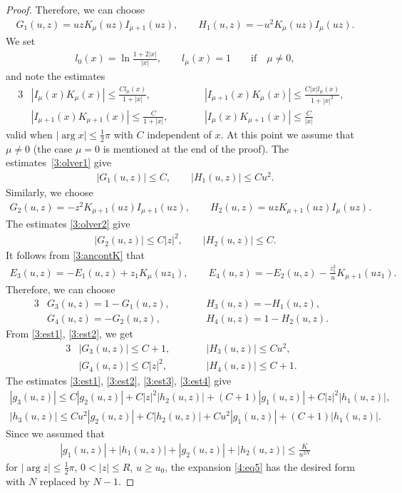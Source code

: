 \documentclass[pdftex]{sigma}
\numberwithin{equation}{section}
\begin{document}
\begin{proof}
Therefore, we can choose
\begin{gather*}
G_1(u,z) = uz K_\mu(uz)I_{\mu+1}(uz),\qquad
H_1(u,z) = -u^2K_\mu(uz)I_\mu(uz) .
\end{gather*}
We set
\begin{gather*}
l_0(x)=\ln\frac{1+2|x|}{|x|},\qquad l_\mu(x)=1\qquad\text{if} \quad \mu\ne 0,
\end{gather*}
and note the estimates \cite[(9.12)]{O}
\begin{alignat}{3}
&|I_\mu(x)K_\mu(x)|\le \frac{C l_\mu(x)}{1+|x|},\qquad&& |I_{\mu+1}(x)K_\mu(x)|\le \frac{C |x|l_\mu(x)}{1+|x|^2},& \label{3:olver1}\\
& |I_{\mu+1}(x)K_{\mu+1}(x)|\le \frac{C}{1+|x|},\qquad&& |I_\mu(x)K_{\mu+1}(x)|\le \frac{C}{|x|}& \label{3:olver2}
\end{alignat}
valid when $|\arg x|\le \frac12\pi$ with $C$ independent of $x$.
At this point we assume that $\mu\ne0$ (the case $\mu=0$ is mentioned at the end of the proof). The estimates~\eqref{3:olver1} give
\begin{gather}\label{3:est1}
|G_1(u,z)|\le C,\qquad |H_1(u,z)|\le C u^2.
\end{gather}
Similarly, we choose
\begin{gather*}
G_2(u,z) = -z^2K_{\mu+1}(uz)I_{\mu+1}(uz),\qquad
H_2(u,z) = uzK_{\mu+1}(uz)I_\mu(uz).
\end{gather*}
The estimates \eqref{3:olver2} give
\begin{gather}\label{3:est2}
|G_2(u,z)|\le C|z|^2,\qquad|H_2(u,z)|\le C.
\end{gather}
It follows from \eqref{3:ancontK} that
\begin{gather*}
E_3(u,z) = -E_1(u,z)+ z_1K_\mu(uz_1),\qquad
E_4(u,z) = -E_2(u,z)-\frac{z_1^2}{u}K_{\mu+1}(uz_1) .
\end{gather*}
Therefore, we can choose
\begin{alignat*}{3}
& G_3(u,z) = 1-G_1(u,z) ,\qquad &&
H_3(u,z) = -H_1(u,z),&\\
& G_4(u,z) = -G_2(u,z),\qquad&&
H_4(u,z) = 1-H_2(u,z).&
\end{alignat*}
From \eqref{3:est1}, \eqref{3:est2}, we get
\begin{alignat}{3}
& |G_3(u,z)|\le C+1,\qquad && |H_3(u,z)|\le C u^2,& \label{3:est3}\\
& |G_4(u,z)|\le C|z|^2,\qquad && |H_4(u,z)|\le C+1 .&\label{3:est4}
\end{alignat}
The estimates \eqref{3:est1}, \eqref{3:est2}, \eqref{3:est3}, \eqref{3:est4}
give
\begin{gather*}
|g_3(u,z)| \le C |g_2(u,z)| + C|z|^2|h_2(u,z)|+(C+1)|g_1(u,z)|+C|z|^2 |h_1(u,z)|,\\
|h_3(u,z)| \le C u^2|g_2(u,z)| + C|h_2(u,z)|+Cu^2|g_1(u,z)|+(C+1) |h_1(u,z)|.
\end{gather*}
Since we assumed that
\begin{gather*}
|g_1(u,z)|+|h_1(u,z)|+|g_2(u,z)|+|h_2(u,z)|\le \frac{K}{u^{2N}}
\end{gather*}
for $| \arg z|\le \frac12\pi$, $0<|z|\le R$, $u\ge u_0$,
the expansion \eqref{4:eq5} has the desired form with $N$ replaced by $N-1$.


\end{proof}
\end{document}

